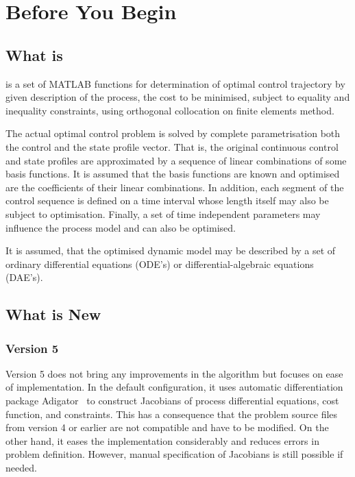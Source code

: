 \chapter{Before You Begin}
\label{cha:beforebegin}

\section{What is~}
\label{sec:whatisdynopt}

 is a set of MATLAB functions for determination of optimal
control trajectory by given description of the process, the cost to be
minimised, subject to equality and inequality constraints, using
orthogonal collocation on finite elements method. 

The actual optimal control problem is solved by complete
parametrisation both the control and the state profile vector. That
is, the original continuous control and state profiles are
approximated by a sequence of linear combinations of some basis
functions. It is assumed that the basis functions are known and
optimised are the coefficients of their linear combinations. In
addition, each segment of the control sequence is defined on a time
interval whose length itself may also be subject to
optimisation. Finally, a set of time independent parameters may
influence the process model and can also be optimised.

It is assumed, that the optimised dynamic model may be described by a
set of ordinary differential equations (ODE's) or
differential-algebraic equations (DAE's).

\section{What is New}
\label{sec:what-new-this}

\subsection*{Version 5}
Version 5 does not bring any improvements in the algorithm but focuses
on ease of implementation. In the default configuration, it uses
automatic differentiation package Adigator~\cite{wei17} to construct
Jacobians of process differential equations, cost function, and
constraints. This has a consequence that the problem source files from
version 4 or earlier are not compatible and have to be modified. On
the other hand, it eases the implementation considerably and reduces
errors in problem definition. However, manual specification of
Jacobians is still possible if needed.

